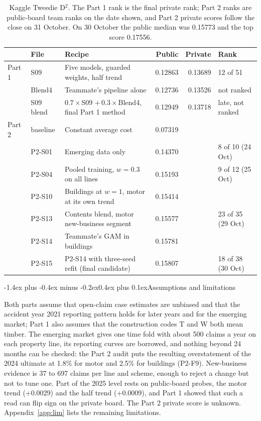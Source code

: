 \documentclass[11pt,a4paper]{article}
\makeatletter
\renewcommand\subsection{\@startsection{subsection}{2}{\z@}%
  {-1.4ex plus -0.4ex minus -0.2ex}{0.4ex plus 0.1ex}{\normalfont\normalsize\bfseries}}
\newcommand{\Dsq}{D$^2$}
\makeatother
\begin{document}
\begin{table}[htbp]
\centering\small
\begin{tabularx}{\textwidth}{llXrrl}
\toprule
 & File & Recipe & Public & Private & Rank\\
\midrule
Part 1 & S09 & Five models, guarded weights, half trend & 0.12863 & 0.13689 & 12 of 51\\
 & Blend4 & Teammate's pipeline alone & 0.12736 & 0.13526 & not ranked\\
 & S09 blend & $0.7\times$S09 $+\,0.3\times$Blend4, final Part 1 method & 0.12949 & 0.13718 & late, not ranked\\
\midrule
Part 2 & baseline & Constant average cost & 0.07319 & & \\
 & P2-S01 & Emerging data only & 0.14370 & & 8 of 10 (24 Oct)\\
 & P2-S04 & Pooled training, $w = 0.3$ on all lines & 0.15193 & & 9 of 12 (25 Oct)\\
 & P2-S10 & Buildings at $w = 1$, motor at its own trend & 0.15414 & & \\
 & P2-S13 & Contents blend, motor new-business segment & 0.15577 & & 23 of 35 (29 Oct)\\
 & P2-S14 & Teammate's GAM in buildings & 0.15781 & & \\
 & P2-S15 & P2-S14 with three-seed refit (final candidate) & 0.15807 & & 18 of 38 (30 Oct)\\
\bottomrule
\end{tabularx}
\caption{Kaggle Tweedie \Dsq{}. The Part 1 rank is the final private rank; Part 2 ranks are public-board team ranks on
the date shown, and Part 2 private scores follow the close on 31 October. On 30 October the public median was 0.15773
and the top score 0.17556.}
\label{tab:results}
\end{table}

\subsection{Assumptions and limitations}

Both parts assume that open-claim case estimates are unbiased and that the accident year 2021 reporting pattern holds
for later years and for the emerging market; Part 1 also assumes that the construction codes T and W both mean timber.
The emerging market gives one time fold with about 500 claims a year on each property line, its reporting curves are
borrowed, and nothing beyond 24 months can be checked: the Part 2 audit puts the resulting overstatement of the 2024
ultimate at 1.8\% for motor and 2.5\% for buildings (P2-F9). New-business evidence is 37 to 697 claims per line and
scheme, enough to reject a change but not to tune one. Part of the 2025 level rests on public-board probes, the motor
trend (+0.0029) and the half trend (+0.0009), and Part 1 showed that such a read can flip sign on the private board. The
Part 2 private score is unknown. Appendix~\ref{app:lim} lists the remaining limitations.
\end{document}

